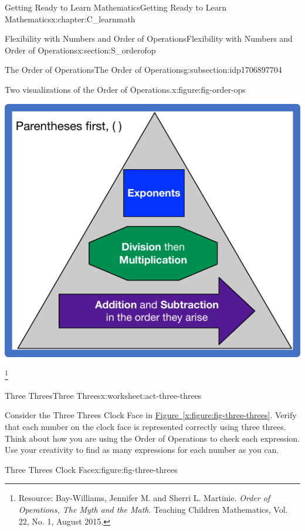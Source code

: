 \documentclass[oneside,10pt,]{book}
\newcommand{\xreffont}{\relax}
\newcommand{\pubtitle}[1]{\textsl{#1}}
\numberwithin{equation}{chapter}
\begin{document}
\begin{chapterptx}{Getting Ready to Learn Mathematics}{}{Getting Ready to Learn Mathematics}{}{}{x:chapter:C_learnmath}
\begin{sectionptx}{Flexibility with Numbers and Order of Operations}{}{Flexibility with Numbers and Order of Operations}{}{}{x:section:S_orderofop}
\begin{subsectionptx}{The Order of Operations}{}{The Order of Operations}{}{}{g:subsection:idp1706897704}
\begin{figureptx}{Two visualizations of the Order of Operations.}{x:figure:fig-order-ops}{}
\begin{sidebyside}{2}{0}{0}{0}
\begin{sbspanel}{0.5}
\includegraphics[width=\linewidth]{external/order-ops-pyr.pdf}
\end{sbspanel}%
\end{sidebyside}%
\tcblower
\end{figureptx}%
 \footnote{Resource: Bay-Williams, Jennifer M. and Sherri L. Martinie. \pubtitle{Order of Operations, The Myth and the Math}. Teaching Children Mathematics, Vol. 22, No. 1, August 2015.\label{g:fn:idp1706921384}}%
\end{subsectionptx}
%
%
\typeout{************************************************}
\typeout{************************************************}
%
\begin{worksheet-subsection}{Three Threes}{}{Three Threes}{}{}{x:worksheet:act-three-threes}
\begin{introduction}{}%
Consider the Three Threes Clock Face in \hyperref[x:figure:fig-three-threes]{Figure~{\xreffont\ref{x:figure:fig-three-threes}}}. Verify that each number on the clock face is represented correctly using three threes. Think about how you are using the Order of Operations to check each expression. Use your creativity to find as many expressions for each number as you can.%
\begin{figureptx}{Three Threes Clock Face}{x:figure:fig-three-threes}{}%
\begin{image}{0.25}{0.5}{0.25}%

\end{image}
\end{figureptx}
\end{introduction}
\end{worksheet-subsection}
\end{sectionptx}
\end{chapterptx}
\end{document}
